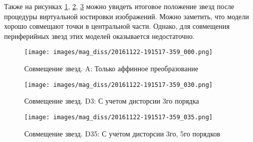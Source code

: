 Также на рисунках \ref{fig:align_a}, \ref{fig:align_d3}, \ref{fig:align_d35} можно увидеть итоговое положение звезд после процедуры виртуальной юстировки изображений. Можно заметить, что модели хорошо совмещают точки в центральной части. Однако, для совмещения периферийных звезд этих моделей оказывается недостаточно.

\begin{figure}[H]
  \centering
  \texttt{[image: images/mag\_diss/20161122-191517-359\_000.png]}
  \caption{Совмещение звезд. A: Только аффинное преобразование}
  \label{fig:align_a}
\end{figure}%

\begin{figure}[H]
  \centering
  \texttt{[image: images/mag\_diss/20161122-191517-359\_030.png]}
  \caption{Совмещение звезд. D3: С учетом дисторсии 3го порядка}
  \label{fig:align_d3}
\end{figure}

\begin{figure}[H]
  \centering
  \texttt{[image: images/mag\_diss/20161122-191517-359\_035.png]}
  \caption{Совмещение звезд. D35: С учетом дисторсии 3го, 5го порядков}
  \label{fig:align_d35}
\end{figure}


%
%

\newpage
